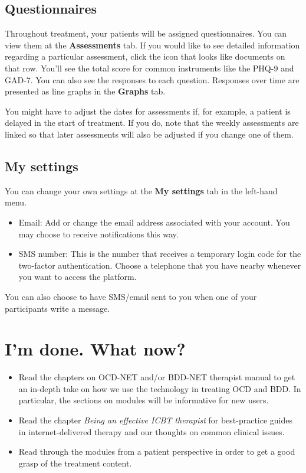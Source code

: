 \documentclass[]{book}
\providecommand{\tightlist}{%
  \setlength{\itemsep}{0pt}\setlength{\parskip}{0pt}}
\begin{document}
\hypertarget{questionnaires-1}{%
\subsection{Questionnaires}\label{questionnaires-1}}

Throughout treatment, your patients will be assigned questionnaires. You can view them at the \textbf{Assessments} tab. If you would like to see detailed information regarding a particular assessment, click the icon that looks like documents on that row. You'll see the total score for common instruments like the PHQ-9 and GAD-7. You can also see the responses to each question. Responses over time are presented as line graphs in the \textbf{Graphs} tab.

You might have to adjust the dates for assessments if, for example, a patient is delayed in the start of treatment. If you do, note that the weekly assessments are linked so that later assessments will also be adjusted if you change one of them.

\hypertarget{my-settings}{%
\subsection{My settings}\label{my-settings}}

You can change your own settings at the \textbf{My settings} tab in the left-hand menu.

\begin{itemize}
\tightlist
\item
  Email: Add or change the email address associated with your account. You may choose to receive notifications this way.
\item
  SMS number: This is the number that receives a temporary login code for the two-factor authentication. Choose a telephone that you have nearby whenever you want to access the platform.
\end{itemize}

You can also choose to have SMS/email sent to you when one of your participants write a message.

\hypertarget{im-done.-what-now}{%
\section{I'm done. What now?}\label{im-done.-what-now}}

\begin{itemize}
\tightlist
\item
  Read the chapters on OCD-NET and/or BDD-NET therapist manual to get an in-depth take on how we use the technology in treating OCD and BDD. In particular, the sections on modules will be informative for new users.
\item
  Read the chapter \emph{Being an effective ICBT therapist} for best-practice guides in internet-delivered therapy and our thoughts on common clinical issues.
\item
  Read through the modules from a patient perspective in order to get a good grasp of the treatment content.
\end{itemize}
\end{document}
